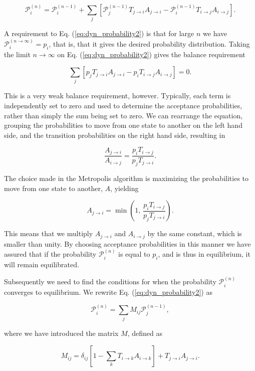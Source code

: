 	\begin{equation}\label{eq:dyn_probability2}
		{\mathcal P}^{(n)}_i = {\mathcal P}^{(n-1)}_i +
		 \sum_j \left [
		{\mathcal P}^{(n-1)}_jT_{j\rightarrow i} A_{j\rightarrow i} 
		-{\mathcal P}^{(n-1)}_iT_{i\rightarrow j}A_{i\rightarrow j}
		\right ] .
	\end{equation}

	A requirement to Eq. (\ref{eq:dyn_probability2}) is that for large $n$ we have $\mathcal{P}_{i}^{(n\rightarrow \infty)}=p_{i}$, that is, that it gives the desired probability distribution. Taking the limit $n\rightarrow \infty$ on Eq. (\ref{eq:dyn_probability2}) gives the balance requirement
	
	\[
		\sum_{j} \left [ p_j T_{j\rightarrow i}A_{j\rightarrow i} - p_i T_{i\rightarrow j}A_{i\rightarrow j} \right ]=0.
	\]
	
	This is a very weak balance requirement, however. Typically, each term is independently set to zero and used to determine the acceptance probabilities, rather than simply the sum being set to zero. We can rearrange the equation, grouping the probabilities to move from one state to another on the left hand side, and the transition probabilities on the right hand side, resulting in
	
	\[
		\frac{ A_{j\rightarrow i}}{A_{i\rightarrow j}}
		= \frac{p_iT_{i\rightarrow j}}{ p_jT_{j\rightarrow i}}.
	\]

	The choice made in the Metropolis algorithm is maximizing the probabilities to move from one state to another, $A$, yielding
	
	\[
		A_{j\rightarrow i} = \min \left ( 1,\, \frac{p_iT_{i\rightarrow j}}{ p_jT_{j\rightarrow i}} \right).
	\]
	
	This means that we multiply $A_{j\rightarrow i}$ and $A_{i\rightarrow j}$ by the same constant, which is smaller than unity. By choosing acceptance probabilities in this manner we have assured that if the probability $\mathcal{P}_i ^{(n)}$ is equal to $p_i$, and is thus in equilibrium, it will remain equilibrated.

	Subsequently we need to find the conditions for when the probability $\mathcal{P}_i ^{(n)}$ converges to equilibrium. We rewrite Eq. (\ref{eq:dyn_probability2}) as
	
	\[
		\mathcal{P}_i ^{(n)}=\sum_j M_{ij}\mathcal{P}_{j}^{(n-1)},
	\]
	
	where we have introduced the matrix $M$, defined as
	
	\[
		M_{ij}=\delta_{ij}\left[1-\sum_k T_{i\rightarrow k}A_{i\rightarrow k} \right]+T_{j\rightarrow i}A_{j\rightarrow i}.
	\]
	
